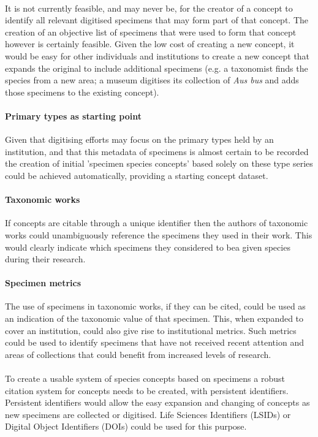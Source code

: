 \documentclass{article}
\begin{document}
   \paragraph{}
   It is not currently feasible, and may never be, for the creator of a concept to identify all relevant digitised specimens that may form part of that concept. The creation of an objective list of specimens that were used to form that concept however is certainly feasible. Given the low cost of creating a new concept, it would be easy for other individuals and institutions to create a new concept that expands the original to include additional specimens (e.g. a taxonomist finds the species from a new area; a museum digitises its collection of \textit{Aus bus} and adds those specimens to the existing concept).
   
   \paragraph{Primary types as starting point}
   Given that digitising efforts may focus on the primary types held by an institution, and that this metadata of specimens is almost certain to be recorded the creation of initial 'specimen species concepts' based solely on these type series could be achieved automatically, providing a starting concept dataset.
   
   \paragraph{Taxonomic works}
   If concepts are citable through a unique identifier then the authors of taxonomic works could unambiguously reference the specimens they used in their work. This would clearly indicate which specimens they considered to bea given species during their research.
   
   \paragraph{Specimen metrics}
   The use of specimens in taxonomic works, if they can be cited, could be used as an indication of the taxonomic value of that specimen. This, when expanded to cover an institution, could also give rise to institutional metrics. Such metrics could be used to identify specimens that have not received recent attention and areas of collections that could benefit from increased levels of research.
   
   \paragraph{}
   To create a usable system of species concepts based on specimens a robust citation system for concepts needs to be created, with persistent identifiers. Persistent identifiers would allow the easy expansion and changing of concepts as new specimens are collected or digitised. Life Sciences Identifiers (LSIDs) or Digital Object Identifiers (DOIs) could be used for this purpose.
   \printbibliography{}
\end{document}
